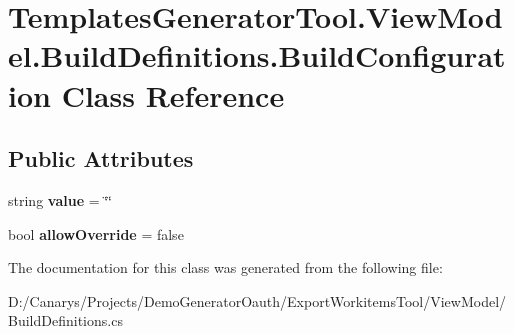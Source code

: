 \hypertarget{class_templates_generator_tool_1_1_view_model_1_1_build_definitions_1_1_build_configuration}{}\section{Templates\+Generator\+Tool.\+View\+Model.\+Build\+Definitions.\+Build\+Configuration Class Reference}
\label{class_templates_generator_tool_1_1_view_model_1_1_build_definitions_1_1_build_configuration}
\subsection*{Public Attributes}
\begin{DoxyCompactItemize}
\item 
\mbox{\label{class_templates_generator_tool_1_1_view_model_1_1_build_definitions_1_1_build_configuration_a2dcaae5e251f8f931964a2d9284fdc58}} 
string {\bfseries value} = \char`\"{}\char`\"{}
\item 
\mbox{\label{class_templates_generator_tool_1_1_view_model_1_1_build_definitions_1_1_build_configuration_a82e1fc21b5497adaa13b49fb02f4b779}} 
bool {\bfseries allow\+Override} = false
\end{DoxyCompactItemize}


The documentation for this class was generated from the following file\+:\begin{DoxyCompactItemize}
\item 
D\+:/\+Canarys/\+Projects/\+Demo\+Generator\+Oauth/\+Export\+Workitems\+Tool/\+View\+Model/Build\+Definitions.\+cs\end{DoxyCompactItemize}
